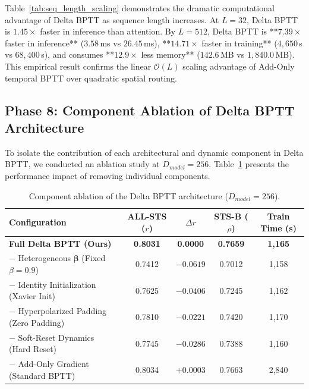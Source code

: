 \documentclass[10pt]{article} %
\begin{document}
Table~\ref{tab:seq_length_scaling} demonstrates the dramatic computational advantage of Delta BPTT as sequence length increases. At $L=32$, Delta BPTT is $1.45\times$ faster in inference than attention. By $L=512$, Delta BPTT is **$7.39\times$ faster in inference** ($3.58$\,ms vs $26.45$\,ms), **$14.71\times$ faster in training** ($4{,}650$\,s vs $68{,}400$\,s), and consumes **$12.9\times$ less memory** ($142.6$\,MB vs $1{,}840.0$\,MB). This empirical result confirms the linear $\mathcal{O}(L)$ scaling advantage of Add-Only temporal BPTT over quadratic spatial routing.

\subsection{Phase 8: Component Ablation of Delta BPTT Architecture}
To isolate the contribution of each architectural and dynamic component in Delta BPTT, we conducted an ablation study at $D_{model}=256$. Table~\ref{tab:component_ablation} presents the performance impact of removing individual components.

\begin{table}[t!]
\caption{Component ablation of the Delta BPTT architecture ($D_{model}=256$).}
\label{tab:component_ablation}
\begin{center}
\begin{tabular}{lcccc}
\toprule
\textbf{Configuration} & \textbf{ALL-STS ($r$)} & \textbf{$\Delta r$} & \textbf{STS-B ($\rho$)} & \textbf{Train Time (s)} \\
\midrule
\textbf{Full Delta BPTT (Ours)} & \textbf{0.8031} & \textbf{0.0000} & \textbf{0.7659} & \textbf{1,165} \\
$-$ Heterogeneous $\bm{\beta}$ (Fixed $\beta=0.9$) & 0.7412 & $-0.0619$ & 0.7012 & 1,158 \\
$-$ Identity Initialization (Xavier Init) & 0.7625 & $-0.0406$ & 0.7245 & 1,162 \\
$-$ Hyperpolarized Padding (Zero Padding) & 0.7810 & $-0.0221$ & 0.7420 & 1,170 \\
$-$ Soft-Reset Dynamics (Hard Reset) & 0.7745 & $-0.0286$ & 0.7388 & 1,160 \\
$-$ Add-Only Gradient (Standard BPTT) & 0.8034 & $+0.0003$ & 0.7663 & 2,840 \\
\bottomrule
\end{tabular}
\end{center}
\end{table}
\end{document}
